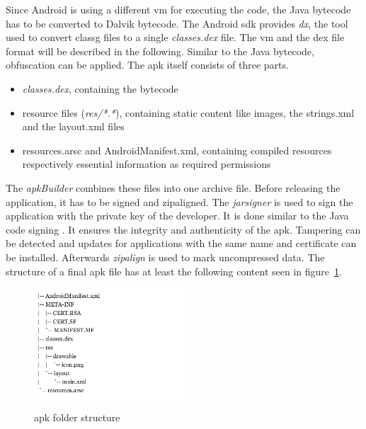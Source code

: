 \newline
Since Android is using a different \gls{vm} for executing the code, the Java bytecode has to be converted to Dalvik bytecode.
The Android \gls{sdk} provides \textit{dx}, the tool used to convert \gls{classg} files to a single \textit{classes.dex} file.
The \gls{vm} and the \gls{dex} file format will be described in the following.
Similar to the Java bytecode, obfuscation can be applied.
\newline
The \gls{apk} itself consists of three parts.
\begin{itemize}
\item \textit{classes.dex}, containing the bytecode
\item resource files (\textit{res/*.*}), containing static content like images, the strings.xml and the layout.xml files
\item resources.arsc and AndroidManifest.xml, containing compiled resources respectively essential information as required permissions
\end{itemize}
The \textit{apkBuilder} combines these files into one archive file.
\newline
Before releasing the application, it has to be signed and zipaligned.
The \textit{jarsigner} is used to sign the application with the private key of the developer.
It is done similar to the Java code signing \cite{codeSigning}.
It ensures the integrity and authenticity of the \gls{apk}.
Tampering can be detected and updates for applications with the same name and certificate can be installed.
Afterwards \textit{zipalign} is used to mark uncompressed data. \cite{androidPublishSign} \cite{andevconDalvikART}
\newline
\newline
The structure of a final \gls{apk} file has at least the following content seen in figure~\ref{fig:apkfolder}.
\begin{figure}[h]
    \centering
    \includegraphics[width=0.5\textwidth]{data/apkfolder.png}
    \caption{\gls{apk} folder structure}
    \label{fig:apkfolder}
\end{figure}
